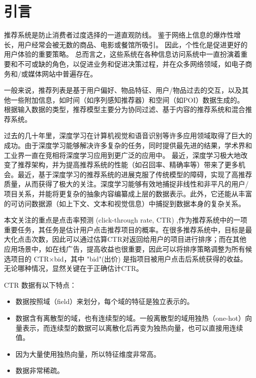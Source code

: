 \documentclass[degree=master,cjk-font=noto]{thuthesis}
\begin{document}
\tableofcontents

\listoffiguresandtables

\mainmatter

\chapter{引言}

推荐系统是防止消费者过度选择的一道直观防线。
鉴于网络上信息的爆炸性增长，用户经常会被无数的商品、电影或餐馆所吸引。
因此，个性化是促进更好的用户体验的重要策略。
总而言之，这些系统在各种信息访问系统中一直扮演着重要和不可或缺的角色，以促进业务和促进决策过程，并在众多网络领域，如电子商务和/或媒体网站中普遍存在。

一般来说，推荐列表是基于用户偏好、物品特征、用户/物品过去的交互，以及其他一些附加信息，如时间（如序列感知推荐器）和空间（如POI）数据生成的。
根据输入数据的类型，推荐模型主要分为协同过滤、基于内容的推荐系统和混合推荐系统。

过去的几十年里，深度学习在计算机视觉和语音识别等许多应用领域取得了巨大的成功。由于深度学习能够解决许多复杂的任务，同时提供最先进的结果，学术界和工业界一直在竞相将深度学习应用到更广泛的应用中。
最近，深度学习极大地改变了推荐架构，并为提高推荐系统的性能（如召回率、精确率等）带来了更多机会。最近，基于深度学习的推荐系统的进展克服了传统模型的障碍，实现了高推荐质量，从而获得了极大的关注。深度学习能够有效地捕捉非线性和非平凡的用户/项目关系，并能将更复杂的抽象内容编纂成上层的数据表示。此外，它还能从丰富的可访问数据源（如上下文、文本和视觉信息）中捕捉到数据本身的复杂关系。

本文关注的重点是点击率预测 (click-through rate, CTR) ,作为推荐系统中的一项重要任务，其任务是估计用户点击推荐项目的概率。在很多推荐系统中，目标是最大化点击次数，因此可以通过估算CTR对返回给用户的项目进行排序；而在其他应用场景中，如在线广告，提高收益也很重要，因此可以将排序策略调整为所有候选项目的 CTR×bid，其中 "bid"(出价) 是指项目被用户点击后系统获得的收益。无论哪种情况，显然关键在于正确估计CTR。

CTR 数据有以下特点：

\begin{itemize}
  \item 数据按照域（field）来划分，每个域的特征是独立表示的。
  \item 数据含有离散型的域，也有连续型的域。一般离散型的域用独热（one-hot）向量表示，而连续型的数据可以离散化后再变为独热向量，也可以直接用连续值。
  \item 因为大量使用独热向量，所以特征维度非常高。
  \item 数据非常稀疏。
\end{itemize}
\end{document}
